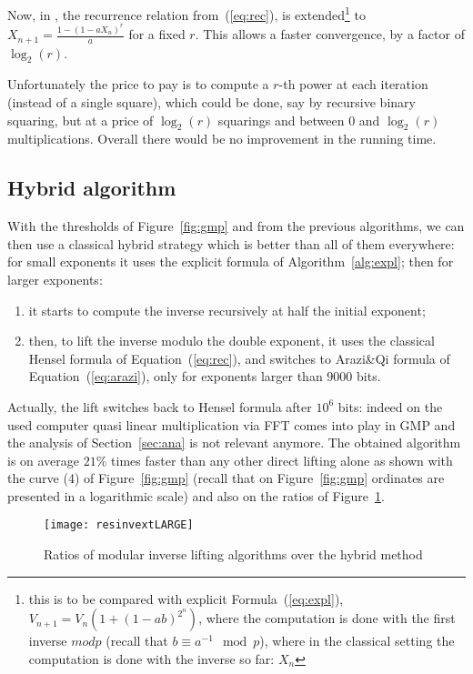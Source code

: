 \begin{remark} 
  Now, in \cite{Krishnamurthy:1983:padic,Xenophontos:2010:fixed},
  the recurrence relation from~(\ref{eq:rec}), is extended\footnote{this is to
    be compared with explicit Formula~(\ref{eq:expl}), $V_{n+1} = V_n
    (1+(1-ab)^{2^n})$, where the computation is done with the first inverse $mod
    p$ (recall that $b\equiv a^{-1} \mod p$), where in the classical setting the
    computation is done with the inverse so far: $X_n$}
  to $X_{n+1} = \frac{1-(1-a X_n)^r}{a}$ for a fixed $r$. 
  This allows a faster convergence, by a factor of $\log_2(r)$. 

  Unfortunately the price to pay
  is to compute a $r$-th power at each iteration (instead of a single square),
  which could be done, say by recursive binary squaring, but at a price of
  $\log_2(r)$ squarings and between $0$ and $\log_2(r)$ multiplications. Overall
  there would be no improvement in the running time.
\end{remark}


\subsection{Hybrid algorithm}




With the thresholds of Figure~\ref{fig:gmp} and from the previous algorithms, 
we can then use a classical hybrid strategy which is better than
all of them everywhere:
for small exponents it uses the explicit formula of Algorithm~\ref{alg:expl};
then for larger exponents:
\begin{enumerate}
\item it starts to compute the inverse recursively at half the initial exponent;
\item then, to lift the inverse modulo the double exponent, it uses the classical Hensel formula of Equation~(\ref{eq:rec}), and
  switches to Arazi\&Qi formula of Equation~(\ref{eq:arazi}), only for exponents
  larger than $9000$ bits. 
\end{enumerate}
Actually, the lift switches back to Hensel formula after $10^6$ bits: indeed on
the used computer quasi linear multiplication via FFT comes into play in GMP and
the analysis of Section~\ref{sec:ana} is not relevant anymore.
The obtained algorithm is on average $21\%$ times faster than any
other direct lifting alone as shown with the curve (4) of
Figure~\ref{fig:gmp} (recall that on Figure~\ref{fig:gmp} ordinates are
presented in a logarithmic scale) and also on the ratios of
Figure~\ref{fig:ratio}.
\begin{figure}[htb]\center\vspace{-2pt}
\texttt{[image: resinvextLARGE]}
\caption{Ratios of modular inverse lifting algorithms over the hybrid method}\label{fig:ratio}\vspace{-2pt}
\end{figure}


